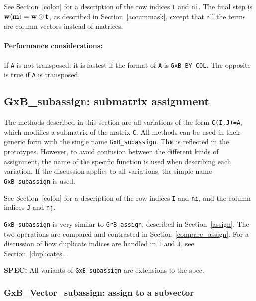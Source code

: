 \documentclass[12pt]{article}
\begin{document}
See Section~\ref{colon} for a description of the row indices
\verb'I' and \verb'ni'.
The final step is ${\bf w \langle m
\rangle  = w \odot t}$, as described in Section~\ref{accummask}, except that
all the terms are column vectors instead of matrices.

\paragraph{\bf Performance considerations:} %
If \verb'A' is not transposed: it is fastest if the format of \verb'A' is
\verb'GxB_BY_COL'.  The opposite is true if \verb'A' is transposed.

\newpage
\subsection{{\sf GxB\_subassign:} submatrix assignment} %
\label{subassign}

The methods described in this section are all variations of the form
\verb'C(I,J)=A', which modifies a submatrix of the matrix \verb'C'.  All
methods can be used in their generic form with the single name
\verb'GxB_subassign'.  This is reflected in the prototypes.  However, to avoid
confusion between the different kinds of assignment, the name of the specific
function is used when describing each variation.  If the discussion applies to
all variations, the simple name \verb'GxB_subassign' is used.

See Section~\ref{colon} for a description of the row indices
\verb'I' and \verb'ni', and the column indices
\verb'J' and \verb'nj'.

\verb'GxB_subassign' is very similar to \verb'GrB_assign', described in
Section~\ref{assign}.  The two operations are compared and contrasted in
Section~\ref{compare_assign}.  For a discussion of how duplicate indices
are handled in \verb'I' and \verb'J', see Section~\ref{duplicates}.

\begin{spec}
{\bf SPEC:} All variants of \verb'GxB_subassign' are extensions to the spec.
\end{spec}

\subsubsection{{\sf GxB\_Vector\_subassign:} assign to a subvector }
\label{subassign_vector}
\end{document}
